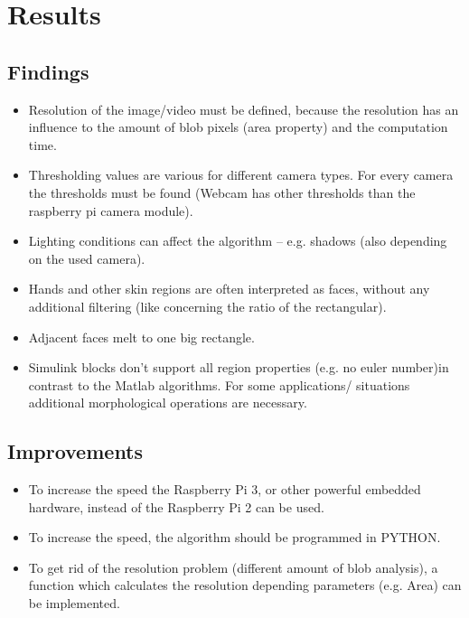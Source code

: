 \documentclass[Bachelorarbeit.tex]{subfiles}
\begin{document}
\chapter{Results}

\section{Findings}
\begin{itemize}
\item Resolution of the image/video must be defined, because the resolution has an influence to the amount of blob pixels (area property) and the computation time.
\item Thresholding values are various for different camera types. For every camera the thresholds must be found (Webcam has other thresholds than the raspberry pi camera module).
\item Lighting conditions can affect the algorithm – e.g. shadows (also depending on the used camera).
\item Hands and other skin regions are often interpreted as faces, without any additional filtering (like concerning the ratio of the rectangular).
\item Adjacent faces melt to one big rectangle.
\item Simulink blocks don't support all region properties (e.g. no euler number)in contrast to the Matlab algorithms. For some applications/ situations additional morphological operations are necessary.

\end{itemize}

\section{Improvements}
\begin{itemize}
\item To increase the speed the Raspberry Pi 3, or other powerful embedded hardware, instead of the Raspberry Pi 2 can be used.
\item To increase the speed, the algorithm should be programmed in PYTHON.
\item To get rid of the resolution problem (different amount of blob analysis), a function which calculates the resolution depending parameters (e.g. Area) can be implemented.
\end{itemize}
\end{document}

